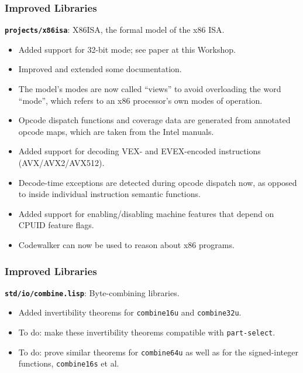 \documentclass{beamer}
\newcommand{\code}[1]{\texttt{#1}}
\newcommand{\bookpath}[1]{\textbf{\code{#1}}}
\newcommand{\implibtitle}{\frametitle{Improved Libraries}}
\begin{document}
\begin{frame}

\implibtitle

\bookpath{projects/x86isa}:
X86ISA, the formal model of the x86 ISA.
\begin{itemize}
\item
Added support for 32-bit mode; see paper at this Workshop.
\item
Improved and extended some documentation.
\item
The model's modes are now called ``views'' to avoid overloading the
word ``mode'', which refers to an x86 processor's own modes of
operation.
\item
Opcode dispatch functions and coverage data are generated from
annotated opcode maps, which are taken from the Intel manuals.
\item
Added support for decoding VEX- and EVEX-encoded instructions
(AVX/AVX2/AVX512).
\item
Decode-time exceptions are detected during opcode dispatch now, as
opposed to inside individual instruction semantic functions.
\item 
Added support for enabling/disabling machine features that depend on
CPUID feature flags.
\item
Codewalker can now be used to reason about x86 programs.
\end{itemize}

\end{frame}


\begin{frame}

\implibtitle

\bookpath{std/io/combine.lisp}:
Byte-combining libraries.
\begin{itemize}
\item
Added invertibility theorems for \code{combine16u} and \code{combine32u}.
\item
To do: make these invertibility theorems compatible with \code{part-select}.
\item
To do: prove similar theorems for \code{combine64u} as well as for the
signed-integer functions, \code{combine16s} et al.
\end{itemize}

\end{frame}

\end{document}

